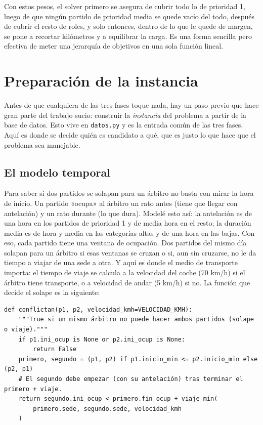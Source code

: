 \documentclass[11pt,a4paper,spanish]{book}
\numberwithin{equation}{chapter}
\numberwithin{figure}{chapter}
\numberwithin{table}{chapter}
\begin{document}
Con estos pesos, el solver primero se asegura de cubrir todo lo de prioridad 1, luego de que ningún partido de prioridad media se quede vacío del todo, después de cubrir el resto de roles, y solo entonces, dentro de lo que le quede de margen, se pone a recortar kilómetros y a equilibrar la carga. Es una forma sencilla pero efectiva de meter una jerarquía de objetivos en una sola función lineal.

\section{Preparación de la instancia}
\label{sec:instancia}

Antes de que cualquiera de las tres fases toque nada, hay un paso previo que hace gran parte del trabajo sucio: construir la \emph{instancia} del problema a partir de la base de datos. Esto vive en \texttt{datos.py} y es la entrada común de las tres fases. Aquí es donde se decide quién es candidato a qué, que es justo lo que hace que el problema sea manejable.

\subsection{El modelo temporal}

Para saber si dos partidos se solapan para un árbitro no basta con mirar la hora de inicio. Un partido «ocupa» al árbitro un rato antes (tiene que llegar con antelación) y un rato durante (lo que dura). Modelé esto así: la antelación es de una hora en los partidos de prioridad 1 y de media hora en el resto; la duración media es de hora y media en las categorías altas y de una hora en las bajas. Con eso, cada partido tiene una ventana de ocupación. Dos partidos del mismo día solapan para un árbitro si esas ventanas se cruzan o si, aun sin cruzarse, no le da tiempo a viajar de una sede a otra. Y aquí es donde el medio de transporte importa: el tiempo de viaje se calcula a la velocidad del coche (70 km/h) si el árbitro tiene transporte, o a velocidad de andar (5 km/h) si no. La función que decide el solape es la siguiente:

\begin{lstlisting}[caption={Detección de solape entre dos partidos para un mismo árbitro, teniendo en cuenta el tiempo de viaje (\texttt{datos.py}).},label={lst:conflictan}]
def conflictan(p1, p2, velocidad_kmh=VELOCIDAD_KMH):
    """True si un mismo árbitro no puede hacer ambos partidos (solape o viaje)."""
    if p1.ini_ocup is None or p2.ini_ocup is None:
        return False
    primero, segundo = (p1, p2) if p1.inicio_min <= p2.inicio_min else (p2, p1)
    # El segundo debe empezar (con su antelación) tras terminar el primero + viaje.
    return segundo.ini_ocup < primero.fin_ocup + viaje_min(
        primero.sede, segundo.sede, velocidad_kmh
    )
\end{lstlisting}
\end{document}
